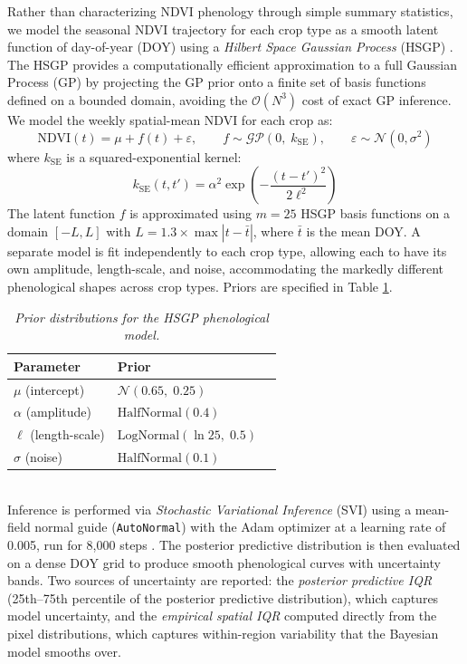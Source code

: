 \documentclass{article}
\begin{document}
Rather than characterizing NDVI phenology through simple summary statistics, we model the seasonal NDVI trajectory for each crop type as a smooth latent function of day-of-year (DOY) using a \textit{Hilbert Space Gaussian Process} (HSGP) \cite{riutort2023hsgp}. The HSGP provides a computationally efficient approximation to a full Gaussian Process (GP) by projecting the GP prior onto a finite set of basis functions defined on a bounded domain, avoiding the $\mathcal{O}(N^3)$ cost of exact GP inference. We model the weekly spatial-mean NDVI for each crop as:
\begin{equation}
    \text{NDVI}(t) = \mu + f(t) + \varepsilon, \qquad
    f \sim \mathcal{GP}\!\left(0,\; k_{\text{SE}}\right), \qquad
    \varepsilon \sim \mathcal{N}(0, \sigma^2)
\end{equation}
where $k_{\text{SE}}$ is a squared-exponential kernel:
\begin{equation}
    k_{\text{SE}}(t, t') = \alpha^2 \exp\!\left(
        -\frac{(t - t')^2}{2\ell^2}
    \right)
\end{equation}
The latent function $f$ is approximated using $m = 25$ HSGP basis functions on a domain $[-L, L]$ with $L = 1.3\times\max|t - \bar{t}|$, where $\bar{t}$ is the mean DOY. A separate model is fit independently to each crop type, allowing each to have its own amplitude, length-scale, and noise, accommodating the markedly different phenological shapes across crop types. Priors are specified in Table \ref{tab:hsgp_priors}.
\begin{table}[htbp]
\centering
\begin{tabular}{lll}
\hline
\textbf{Parameter} & \textbf{Prior}\\
\hline
$\mu$ (intercept) & $\mathcal{N}(0.65,\; 0.25)$\\
$\alpha$ (amplitude) & $\text{HalfNormal}(0.4)$\\
$\ell$ (length-scale) & $\text{LogNormal}(\ln 25,\; 0.5)$\\
$\sigma$ (noise) & $\text{HalfNormal}(0.1)$\\
\hline
\end{tabular}
\caption{\textit{Prior distributions for the HSGP phenological model.}}
\label{tab:hsgp_priors}
\end{table}
\\
Inference is performed via \textit{Stochastic Variational Inference} (SVI) using a mean-field normal guide (\texttt{AutoNormal}) with the Adam optimizer at a learning rate of 0.005, run for 8{,}000 steps \cite{numpyro}. The posterior predictive distribution is then evaluated on a dense DOY grid to produce smooth phenological curves with uncertainty bands. Two sources of uncertainty are reported: the \textit{posterior predictive IQR} (25th--75th percentile of the posterior predictive distribution), which captures model uncertainty, and the \textit{empirical spatial IQR} computed directly from the pixel distributions, which captures within-region variability that the Bayesian model smooths over.
\end{document}
